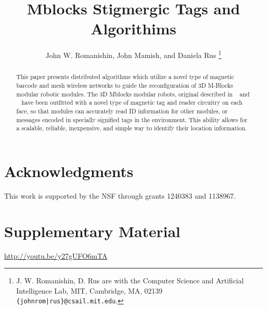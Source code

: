 \documentclass[letterpaper, 10 pt, conference]{ieeeconf}
\title{\LARGE \bf Mblocks Stigmergic Tags and Algorithims}
\author{John W. Romanishin, John Mamish, and Daniela Rus
  \thanks{J. W. Romanishin, D. Rus are with the Computer Science
    and Artificial Intelligence Lab, MIT, Cambridge, MA, 02139
    {\tt\small \{johnrom|rus\}@csail.mit.edu}.}
}
\begin{document}
	
\newcommand{\tagName}{mtag }
\newcommand{\tagNamePlural}{mtags }

\captionsetup[figure]{labelfont=small, textfont=small}
\captionsetup[table]{labelfont=small, textfont=small}

\maketitle

\thispagestyle{empty}
\pagestyle{empty}

\begin{abstract}

This paper presents distributed algorithms which utilize a novel type of magnetic barcode and mesh wireless networks to guide the reconfiguration of 3D M-Blocks modular robotic modules. The 3D Mblocks modular robots, original described in ~\cite{RomanishinRus-IROS13} and ~\cite{RomanishinRus-IROS13} have been outfitted with a novel type of magnetic tag and reader circuitry on each face, so that modules can accurately read ID information for other modules, or messages encoded in specially signified tags in the environment. This ability allows for a scalable, reliable, inexpensive, and simple way to identify their location information.

\end{abstract}













\section*{Acknowledgments}
This work is supported by the NSF through grants 1240383 and 1138967.
\section*{Supplementary Material}
\url{http://youtu.be/y27gUFO6mTA}




\end{document}
